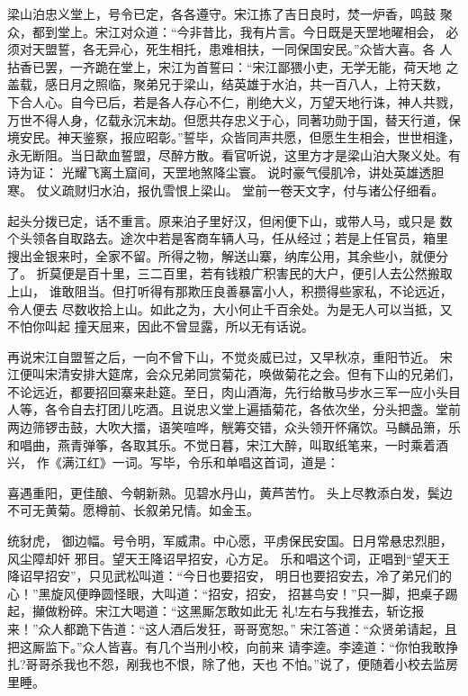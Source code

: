 梁山泊忠义堂上，号令已定，各各遵守。宋江拣了吉日良时，焚一炉香，鸣鼓
聚众，都到堂上。宋江对众道：“今非昔比，我有片言。今日既是天罡地曜相会，
必须对天盟誓，各无异心，死生相托，患难相扶，一同保国安民。”众皆大喜。各
人拈香已罢，一齐跪在堂上，宋江为首誓曰：“宋江鄙猥小吏，无学无能，荷天地
之盖载，感日月之照临，聚弟兄于梁山，结英雄于水泊，共一百八人，上符天数，
下合人心。自今已后，若是各人存心不仁，削绝大义，万望天地行诛，神人共戮，
万世不得人身，亿载永沉末劫。但愿共存忠义于心，同著功勋于国，替天行道，保
境安民。神天鉴察，报应昭彰。”誓毕，众皆同声共愿，但愿生生相会，世世相逢，
永无断阻。当日歃血誓盟，尽醉方散。看官听说，这里方才是梁山泊大聚义处。有
诗为证：
光耀飞离土窟间，天罡地煞降尘寰。
说时豪气侵肌冷，讲处英雄透胆寒。
仗义疏财归水泊，报仇雪恨上梁山。
堂前一卷天文字，付与诸公仔细看。

起头分拨已定，话不重言。原来泊子里好汉，但闲便下山，或带人马，或只是
数个头领各自取路去。途次中若是客商车辆人马，任从经过；若是上任官员，箱里
搜出金银来时，全家不留。所得之物，解送山寨，纳库公用，其余些小，就便分了。
折莫便是百十里，三二百里，若有钱粮广积害民的大户，便引人去公然搬取上山，
谁敢阻当。但打听得有那欺压良善暴富小人，积攒得些家私，不论远近，令人便去
尽数收拾上山。如此之为，大小何止千百余处。为是无人可以当抵，又不怕你叫起
撞天屈来，因此不曾显露，所以无有话说。

再说宋江自盟誓之后，一向不曾下山，不觉炎威已过，又早秋凉，重阳节近。
宋江便叫宋清安排大筵席，会众兄弟同赏菊花，唤做菊花之会。但有下山的兄弟们，
不论远近，都要招回寨来赴筵。至日，肉山酒海，先行给散马步水三军一应小头目
人等，各令自去打团儿吃酒。且说忠义堂上遍插菊花，各依次坐，分头把盏。堂前
两边筛锣击鼓，大吹大擂，语笑喧哗，觥筹交错，众头领开怀痛饮。马麟品箫，乐
和唱曲，燕青弹筝，各取其乐。不觉日暮，宋江大醉，叫取纸笔来，一时乘着酒兴，
作《满江红》一词。写毕，令乐和单唱这首词，道是：

喜遇重阳，更佳酿、今朝新熟。见碧水丹山，黄芦苦竹。
头上尽教添白发，鬓边不可无黄菊。愿樽前、长叙弟兄情。如金玉。

统豺虎，
御边幅。号令明，军威肃。中心愿，平虏保民安国。日月常悬忠烈胆，风尘障却奸
邪目。望天王降诏早招安，心方足。
乐和唱这个词，正唱到“望天王降诏早招安”，只见武松叫道：“今日也要招安，
明日也要招安去，冷了弟兄们的心！”黑旋风便睁圆怪眼，大叫道：“招安，招安，
招甚鸟安！”只一脚，把桌子踢起，攧做粉碎。宋江大喝道：“这黑厮怎敢如此无
礼!左右与我推去，斩讫报来！”众人都跪下告道：“这人酒后发狂，哥哥宽恕。”
宋江答道：“众贤弟请起，且把这厮监下。”众人皆喜。有几个当刑小校，向前来
请李逵。李逵道：“你怕我敢挣扎?哥哥杀我也不怨，剐我也不恨，除了他，天也
不怕。”说了，便随着小校去监房里睡。

